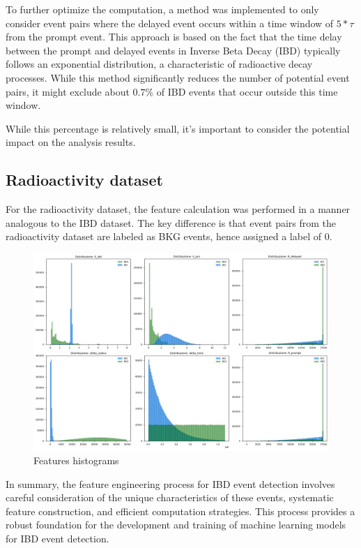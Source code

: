To further optimize the computation, a method was implemented to only consider event pairs where the delayed event occurs within a time window of $5*\tau$ from the prompt event. This approach is based on the fact that the time delay between the prompt and delayed events in Inverse Beta Decay (IBD) typically follows an exponential distribution, a characteristic of radioactive decay processes. While this method significantly reduces the number of potential event pairs, it might exclude about $0.7\%$ of IBD events that occur outside this time window. 

While this percentage is relatively small, it's important to consider the potential impact on the analysis results.

\subsection{Radioactivity dataset}
For the radioactivity dataset, the feature calculation was performed in a manner analogous to the IBD dataset. The key difference is that event pairs from the radioactivity dataset are labeled as BKG events, hence assigned a label of 0.



\begin{figure}[h]
	\centering
	\includegraphics[width=1\linewidth]{Images/hist_features.png}
	\caption{Features histograms}
	\label{fig:hist_features}
\end{figure}



In summary, the feature engineering process for IBD event detection involves careful consideration of the unique characteristics of these events, systematic feature construction, and efficient computation strategies. This process provides a robust foundation for the development and training of machine learning models for IBD event detection.


